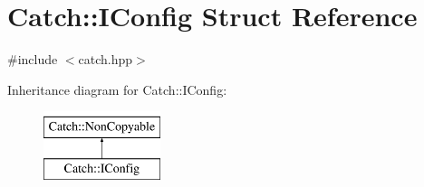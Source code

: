 \hypertarget{struct_catch_1_1_i_config}{}\section{Catch\+::I\+Config Struct Reference}
\label{struct_catch_1_1_i_config}


{\ttfamily \#include $<$catch.\+hpp$>$}

Inheritance diagram for Catch\+::I\+Config\+:\begin{figure}[H]
\begin{center}
\leavevmode
\includegraphics[height=2.000000cm]{struct_catch_1_1_i_config}
\end{center}
\end{figure}

